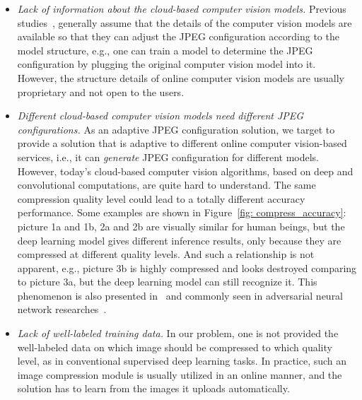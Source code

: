 \begin{itemize}

\item \emph{Lack of information about the cloud-based computer vision models.} Previous studies~\cite{DeepN-JPEG, torfason2018towards, gueguen2018faster}, generally assume that the details of the computer vision models are available so that they can adjust the JPEG configuration according to the model structure, e.g., one can train a model to determine the JPEG configuration by plugging the original computer vision model into it. However, the structure details of online computer vision models are usually proprietary and not open to the users. 

\item \emph{Different cloud-based computer vision models need different JPEG configurations.} As an adaptive JPEG configuration solution, we target to provide a solution that is adaptive to different online computer vision-based services, i.e., it can \emph{generate} JPEG configuration for different models. However, today's cloud-based computer vision algorithms, based on deep and convolutional computations, are quite hard to understand. The same compression quality level could lead to a totally different accuracy performance. Some examples are shown in Figure~\ref{fig: compress_accuracy}: picture 1a and 1b, 2a and 2b are visually similar for human beings, but the deep learning model gives different inference results, only because they are compressed at different quality levels. And such a relationship is not apparent, e.g., picture 3b is highly compressed and looks destroyed comparing to picture 3a, but the deep learning model can still recognize it. This phenomenon is also presented in~\cite{delac2005effects} and commonly seen in adversarial neural network researches~\cite{yuan2019adversarial, evtimov2018robust}.

\item \emph{Lack of well-labeled training data.} In our problem, one is not provided the well-labeled data on which image should be compressed to which quality level, as in conventional supervised deep learning tasks. In practice, such an image compression module is usually utilized in an online manner, and the solution has to learn from the images it uploads automatically. 
\end{itemize} 

